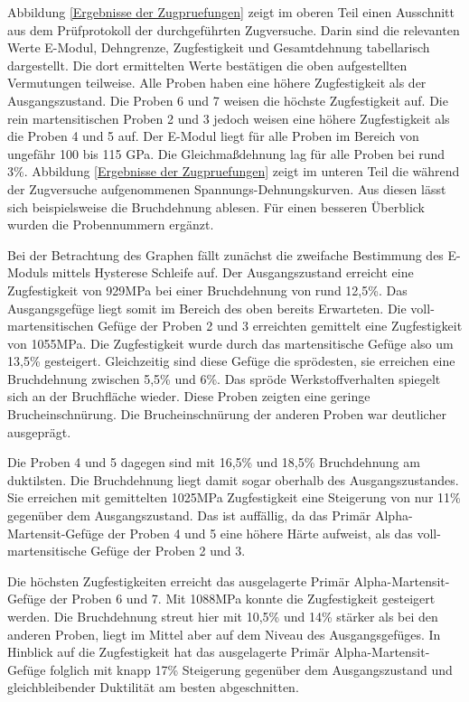 \documentclass[a4paper, 11pt]{tubsreprt}
\begin{document}
Abbildung \ref{Ergebnisse der Zugpruefungen} zeigt im oberen Teil einen Ausschnitt aus dem Prüfprotokoll der durchgeführten Zugversuche. Darin sind die relevanten Werte E-Modul, Dehngrenze, Zugfestigkeit und Gesamtdehnung tabellarisch dargestellt. Die dort ermittelten Werte bestätigen die oben aufgestellten Vermutungen teilweise. Alle Proben haben eine höhere Zugfestigkeit als der Ausgangszustand. Die Proben 6 und 7 weisen die höchste Zugfestigkeit auf. Die rein martensitischen Proben 2 und 3 jedoch weisen eine höhere Zugfestigkeit als die Proben 4 und 5 auf. Der E-Modul liegt für alle Proben im Bereich von ungefähr 100 bis 115 GPa. Die Gleichmaßdehnung lag für alle Proben bei rund 3\%. Abbildung \ref{Ergebnisse der Zugpruefungen} zeigt im unteren Teil die während der Zugversuche aufgenommenen Spannungs-Dehnungskurven. Aus diesen lässt sich beispielsweise die Bruchdehnung ablesen. Für einen besseren Überblick wurden die Probennummern ergänzt.

Bei der Betrachtung des Graphen fällt zunächst die zweifache Bestimmung des E-Moduls mittels Hysterese Schleife auf.  Der Ausgangszustand erreicht eine Zugfestigkeit von 929MPa bei einer Bruchdehnung von rund 12,5\%. Das Ausgangsgefüge liegt somit im Bereich des oben bereits Erwarteten. Die voll-martensitischen Gefüge der Proben 2 und 3 erreichten gemittelt eine Zugfestigkeit von 1055MPa. Die Zugfestigkeit wurde durch das martensitische Gefüge also um 13,5\% gesteigert. Gleichzeitig sind diese Gefüge die sprödesten, sie erreichen eine Bruchdehnung zwischen 5,5\% und 6\%. Das spröde Werkstoffverhalten spiegelt sich an der Bruchfläche wieder. Diese Proben zeigten eine geringe Brucheinschnürung. Die Brucheinschnürung der anderen Proben war deutlicher ausgeprägt.

Die Proben 4 und 5 dagegen sind mit 16,5\% und 18,5\% Bruchdehnung am duktilsten. Die Bruchdehnung liegt damit sogar oberhalb des Ausgangszustandes. Sie erreichen mit gemittelten 1025MPa Zugfestigkeit eine Steigerung von nur 11\% gegenüber dem Ausgangszustand. Das ist auffällig, da das Primär Alpha-Martensit-Gefüge der Proben 4 und 5 eine höhere Härte aufweist, als das voll-martensitische Gefüge der Proben 2 und 3.

Die höchsten Zugfestigkeiten erreicht das ausgelagerte Primär Alpha-Martensit-Gefüge der Proben 6 und 7. Mit 1088MPa konnte die Zugfestigkeit gesteigert werden. Die Bruchdehnung streut hier mit 10,5\% und 14\% stärker als bei den anderen Proben, liegt im Mittel aber auf dem Niveau des Ausgangsgefüges. In Hinblick auf die Zugfestigkeit hat das ausgelagerte Primär Alpha-Martensit-Gefüge folglich mit knapp 17\% Steigerung gegenüber dem Ausgangszustand und gleichbleibender Duktilität am besten abgeschnitten. 
\end{document}
